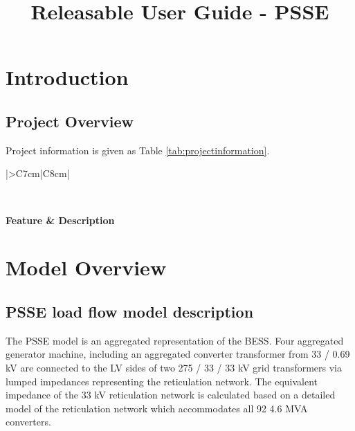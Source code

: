 \documentclass{../grid-link-report}
\title{Releasable User Guide - PSSE}
\newcommand{\projectassetsdir}{../project-assets}
\begin{document}
	
	\frontmatter
	\maketitle
	
	\makedisclaimer
	\clearpage
	\tableofcontents
	\makerevisionhistorypage
	
	\mainmatter
	
	\chapter{Introduction}
	\section{Project Overview}
    
    
    Project information is given as Table \ref{tab:projectinformation}.
    
    {	
    	\thicktablelines
    	\begin{longtable}{|>{}C{7cm}|C{8cm}|}
    		\caption{Project Information}
    		\label{tab:projectinformation} \\
    		\toprule
    		
    		\bfseries \color{white}Feature & \bfseries \color{white}Description \\
    		\endhead
    		\bottomrule \endfoot
    	\end{longtable}
    	
    }
    

	\chapter{Model Overview}
	
	\section{PSSE load flow model description}

	The PSSE model is an aggregated representation of the \ac{BESS}. Four aggregated generator machine, including an aggregated converter transformer from 33 / 0.69 kV are connected to the LV sides of two 275 / 33 / 33 kV grid transformers via lumped impedances representing the reticulation network. The equivalent impedance of the 33 kV reticulation network is calculated based on a detailed model of the reticulation network which accommodates all 92 4.6 MVA converters.
	
\end{document}

